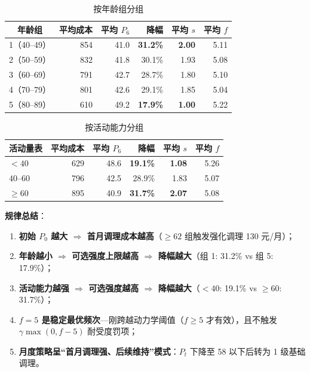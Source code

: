 \documentclass{MathorCupmodeling}
\providecommand{\tightlist}{%
  \setlength{\itemsep}{0pt}\setlength{\parskip}{0pt}}
\begin{document}
\begin{table}[H]
\centering\small
\caption{按年龄组分组}
\begin{tabular}{@{}c r r r r r@{}}
\toprule
年龄组 & 平均成本 & 平均 $P_6$ & 降幅 & 平均 $s$ & 平均 $f$ \\
\midrule
1（40--49） & 854 & 41.0 & \textbf{31.2\%} & \textbf{2.00} & 5.11 \\
2（50--59） & 832 & 41.8 & 30.1\% & 1.93 & 5.08 \\
3（60--69） & 791 & 42.7 & 28.7\% & 1.80 & 5.10 \\
4（70--79） & 801 & 42.6 & 29.1\% & 1.85 & 5.04 \\
5（80--89） & 610 & 49.2 & \textbf{17.9\%} & \textbf{1.00} & 5.22 \\
\bottomrule
\end{tabular}
\end{table}

\begin{table}[H]
\centering\small
\caption{按活动能力分组}
\begin{tabular}{@{}l r r r r r@{}}
\toprule
活动量表 & 平均成本 & 平均 $P_6$ & 降幅 & 平均 $s$ & 平均 $f$ \\
\midrule
$< 40$    & 629 & 48.6 & \textbf{19.1\%} & \textbf{1.08} & 5.26 \\
$40$--$60$ & 796 & 42.5 & 28.9\% & 1.83 & 5.07 \\
$\ge 60$  & 895 & 40.9 & \textbf{31.7\%} & \textbf{2.07} & 5.08 \\
\bottomrule
\end{tabular}
\end{table}

\textbf{规律总结}：
\begin{enumerate}
\def\labelenumi{(\arabic{enumi})}
\tightlist
\item \textbf{初始 $P_0$ 越大 $\Rightarrow$ 首月调理成本越高}（$\ge 62$ 组触发强化调理 130 元/月）；
\item \textbf{年龄越小 $\Rightarrow$ 可选强度上限越高 $\Rightarrow$ 降幅越大}（组 1: 31.2\% vs 组 5: 17.9\%）；
\item \textbf{活动能力越强 $\Rightarrow$ 可选强度越高 $\Rightarrow$ 降幅越大}（$<40$: 19.1\% vs $\ge 60$: 31.7\%）；
\item \textbf{$f = 5$ 是稳定最优频次}---刚跨越动力学阈值（$f \ge 5$ 才有效），且不触发 $\gamma \max(0, f-5)$ 耐受度罚项；
\item \textbf{月度策略呈``首月调理强、后续维持''模式}：$P_t$ 下降至 58 以下后转为 1 级基础调理。
\end{enumerate}
\end{document}
